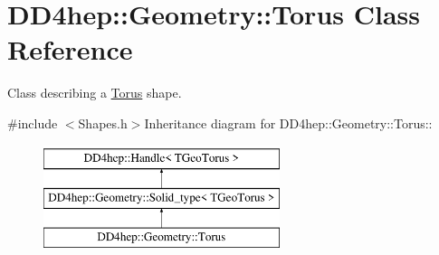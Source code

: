 \hypertarget{class_d_d4hep_1_1_geometry_1_1_torus}{
\section{DD4hep::Geometry::Torus Class Reference}
\label{class_d_d4hep_1_1_geometry_1_1_torus}
}


Class describing a \hyperlink{class_d_d4hep_1_1_geometry_1_1_torus}{Torus} shape.  


{\ttfamily \#include $<$Shapes.h$>$}Inheritance diagram for DD4hep::Geometry::Torus::\begin{figure}[H]
\begin{center}
\leavevmode
\includegraphics[height=3cm]{class_d_d4hep_1_1_geometry_1_1_torus}
\end{center}
\end{figure}
